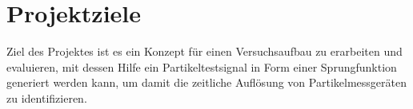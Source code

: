 \section{Projektziele}
Ziel des Projektes ist es ein Konzept f\"{u}r einen Versuchsaufbau zu erarbeiten und evaluieren, mit dessen Hilfe ein Partikeltestsignal in Form einer Sprungfunktion generiert werden kann, um damit die zeitliche Aufl\"{o}sung von Partikelmessger\"{a}ten zu identifizieren. 